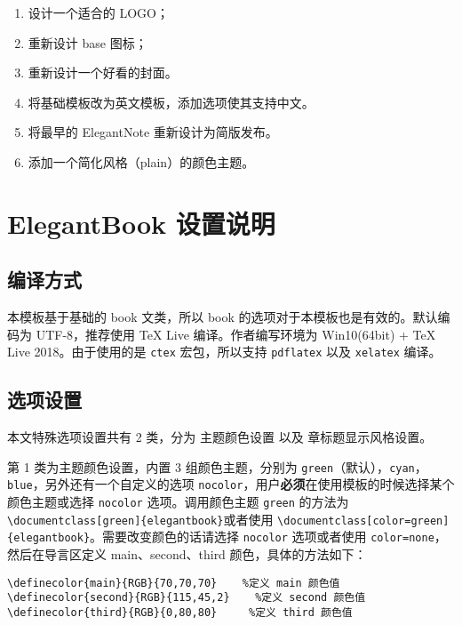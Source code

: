 \documentclass[titlestyle=hang,11pt]{elegantbook}
\begin{document}
\begin{enumerate}[noitemsep]
   \item 设计一个适合的 LOGO；
   \item 重新设计 base 图标；
   \item 重新设计一个好看的封面。
   \item 将基础模板改为英文模板，添加选项使其支持中文。
   \item 将最早的 ElegantNote 重新设计为简版发布。
   \item 添加一个简化风格（plain）的颜色主题。
\end{enumerate}

\chapter{ElegantBook 设置说明}


\section{编译方式}

本模板基于基础的 book 文类，所以 book 的选项对于本模板也是有效的。默认编码为 UTF-8，推荐使用 \TeX{} Live 编译。作者编写环境为 Win10(64bit) + \TeX{} Live 2018。由于使用的是 \texttt{ctex} 宏包，所以支持 \texttt{pdflatex} 以及 \texttt{xelatex} 编译。


\section{选项设置}
本文特殊选项设置共有 2 类，分为 {\color{main}主题颜色}设置 以及 {\color{main}章标题显示风格}设置。

第 1 类为{\color{main}主题颜色}设置，内置 3 组颜色主题，分别为 \verb|green|（默认），\verb|cyan|，\verb|blue|，另外还有一个自定义的选项 \verb|nocolor|，用户\textbf{必须}在使用模板的时候选择某个颜色主题或选择 \verb|nocolor| 选项。调用颜色主题 \verb|green| 的方法为 \verb|\documentclass[green]{elegantbook}|或者使用 \verb|\documentclass[color=green]{elegantbook}|。需要改变颜色的话请选择 \verb|nocolor| 选项或者使用 \verb|color=none|，然后在导言区定义 main、second、third 颜色，具体的方法如下：
\begin{verbatim}
\definecolor{main}{RGB}{70,70,70}    %定义 main 颜色值
\definecolor{second}{RGB}{115,45,2}    %定义 second 颜色值
\definecolor{third}{RGB}{0,80,80}     %定义 third 颜色值
\end{verbatim}
\end{document}
